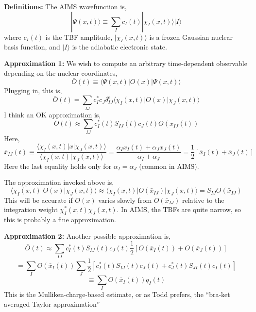 \documentclass[fleqn,oneside,12pt]{article}
\date{}
\begin{document}

\textbf{Definitions:} The AIMS wavefunction is,
\[
| \Psi (x, t) \rangle
\equiv
\sum_{I}
c_{I} (t)
| \chi_{I} (x, t) \rangle
| I \rangle
\]
where $c_{I} (t)$ is the TBF amplitude, $| \chi_{I} (x,t) \rangle$ is a frozen
Gaussian nuclear basis function, and $| I \rangle$ is the adiabatic electronic
state.

\textbf{Approximation 1:} We wish to compute an arbitrary time-dependent
observable depending on the nuclear coordinates,
\[
\bar O (t)
\equiv
\langle \Psi (x, t) |
O (x)
| \Psi (x, t) \rangle
\]
Plugging in, this is,
\[
\bar O(t)
=
\sum_{IJ}
c_{I}^{*}
c_{J}
\delta_{IJ}^{\mathrm{e}}
\langle \chi_{I} (x, t) |
O (x)
| \chi_{J} (x, t) \rangle
\]
I think an OK approximation is,
\[
\bar O(t)
\approx
\sum_{IJ}
c_{I}^{*} (t)
S_{IJ} (t)
c_{J} (t)
O (\bar x_{IJ} (t)) 
\]
Here,
\[
\bar x_{IJ} (t)
\equiv
\frac{\langle \chi_{I} (x, t) | x | \chi_{J} (x, t) \rangle}
{\langle \chi_{I} (x, t) | \chi_{J} (x, t) \rangle}
=
\frac{\alpha_{I} x_{I} (t) + \alpha_{J} x_{J} (t)}{\alpha_{I} + \alpha_{J}}
=
\frac{1}{2}
\left [
\bar x_{I} (t)
+
\bar x_{J} (t)
\right ]
\]
Here the last equality holds only for $\alpha_{I} = \alpha_{J}$ (common in
AIMS).

The approximation invoked above is,
\[
\langle \chi_{I} (x, t) | O (x) | \chi_{J} (x, t) \rangle
\approx
\langle \chi_{I} (x, t) | O (\bar x_{IJ}) | \chi_{J} (x, t) \rangle
=
S_{IJ}
O(\bar x_{IJ})
\]
This will be accurate if $O(x)$ varies slowly from $O(\bar x_{IJ})$ relative to
the integration weight $\chi_{I}^{*} (x, t) \chi_{J} (x, t)$. In AIMS, the TBFs
are quite narrow, so this is probably a fine approximation.

\textbf{Approximation 2:} Another possible approximation is,
\[
\bar O(t)
\approx
\sum_{IJ}
c_{I}^{*} (t)
S_{IJ} (t)
c_{J} (t)
\frac{1}{2}
\left [
O(\bar x_{I} (t))
+
O(\bar x_{J} (t))
\right ]
\]
\[
=
\sum_{I}
O (\bar x_I (t))
\sum_{J}
\frac{1}{2}
\left [
c_{I}^{*} (t)
S_{IJ} (t)
c_{J} (t) 
+
c_{J}^{*} (t)
S_{JI} (t) 
c_{I} (t)
\right ]
\]
\[
\equiv
\sum_{I}
O (\bar x_I (t))
q_{I} (t)
\]
This is the Mulliken-charge-based estimate, or as Todd prefers, the ``bra-ket
averaged Taylor approximation''
\end{document}
